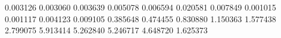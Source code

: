 0.003126
0.003060
0.003639
0.005078
0.006594
0.020581
0.007849
0.001015
0.001117
0.004123
0.009105
0.385648
0.474455
0.830880
1.150363
1.577438
2.799075
5.913414
5.262840
5.246717
4.648720
1.625373
